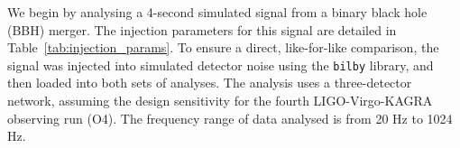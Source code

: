 \documentclass[fleqn,usenatbib]{mnras}
\begin{document}


We begin by analysing a 4-second simulated signal from a binary black
hole (BBH) merger. The injection parameters for this signal are
detailed in Table~\ref{tab:injection_params}. To ensure a direct,
like-for-like comparison, the signal was injected into simulated
detector noise using the \texttt{bilby} library, and 
then loaded into both sets of analyses. The analysis
uses a three-detector network, assuming the design
sensitivity for the fourth LIGO-Virgo-KAGRA observing run (O4).
The frequency range of data analysed is from 20 Hz to 1024 Hz.
\end{document}
